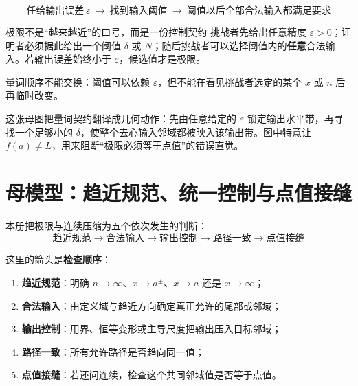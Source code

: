\documentclass[11pt,a4paper]{ctexart}
\newcommand{\kw}[1]{\textbf{\color{deep}#1}}
\begin{document}
\[
\boxed{\text{任给输出误差}\ \varepsilon
\ \longrightarrow\ \text{找到输入阈值}
\ \longrightarrow\ \text{阈值以后全部合法输入都满足要求}}
\]

\begin{corebox}{极限不是“越来越近”的口号，而是一份控制契约}
挑战者先给出任意精度 $\varepsilon>0$；证明者必须据此给出一个阈值 $\delta$ 或 $N$；随后挑战者可以选择阈值内的\textbf{任意}合法输入。若输出误差始终小于 $\varepsilon$，候选值才是极限。

量词顺序不能交换：阈值可以依赖 $\varepsilon$，但不能在看见挑战者选定的某个 $x$ 或 $n$ 后再临时改变。
\end{corebox}

\begin{center}

\end{center}

这张母图把量词契约翻译成几何动作：先由任意给定的 $\varepsilon$ 锁定输出水平带，再寻找一个足够小的 $\delta$，使整个去心输入邻域都被映入该输出带。图中特意让 $f(a)\ne L$，用来阻断“极限必须等于点值”的错误直觉。

\section{母模型：趋近规范、统一控制与点值接缝}

本册把极限与连续压缩为五个依次发生的判断：
\[
\boxed{
\text{趋近规范}
\to \text{合法输入}
\to \text{输出控制}
\to \text{路径一致}
\to \text{点值接缝}
}
\]

这里的箭头是\textbf{检查顺序}：
\begin{enumerate}
  \item \kw{趋近规范}：明确 $n\to\infty$、$x\to a^\pm$、$x\to a$ 还是 $x\to\infty$；
  \item \kw{合法输入}：由定义域与趋近方向确定真正允许的尾部或邻域；
  \item \kw{输出控制}：用界、恒等变形或主导尺度把输出压入目标邻域；
  \item \kw{路径一致}：所有允许路径是否趋向同一值；
  \item \kw{点值接缝}：若还问连续，检查这个共同邻域值是否等于点值。
\end{enumerate}
\end{document}
